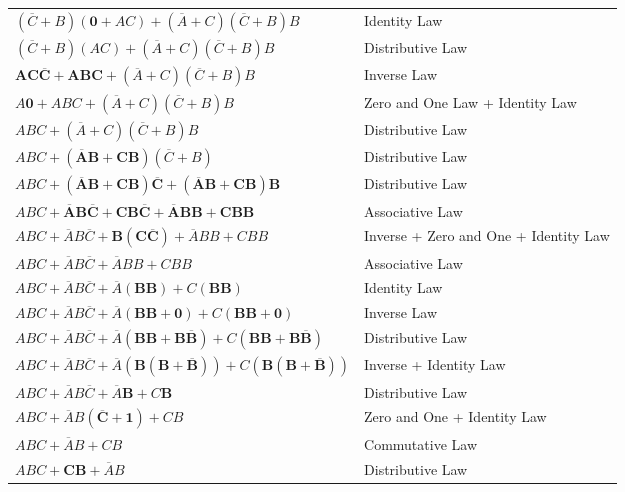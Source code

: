\documentclass{article}
\begin{document}
\begin{enumerate}
\begin{enumerate}
\begin{tabular}{l l}
                $(\overline{C} + B)(\mathbf{0} + AC) + (\overline{A} + C)(\overline{C} + B)B$ & Identity Law \\
                $(\overline{C} + B)(AC) + (\overline{A} + C)(\overline{C} + B)B$ & Distributive Law \\
                $\mathbf{AC\overline{C} + ABC} + (\overline{A} + C)(\overline{C} + B)B$ & Inverse Law\\
                $A\mathbf{0} + ABC + (\overline{A} + C)(\overline{C} + B)B$ & Zero and One Law + Identity Law\\
                $ABC + (\overline{A} + C)(\overline{C} + B)B$ & Distributive Law\\
                $ABC + \mathbf{(\overline{A}B+CB)}(\overline{C} + B)$ & Distributive Law\\
                $ABC + \mathbf{(\overline{A}B + CB)\overline{C} + (\overline{A}B + CB)B}$ & Distributive Law\\
                $ABC + \mathbf{\overline{A}B\overline{C} + CB\overline{C} + \overline{A}BB + CBB}$ & Associative Law\\
                $ABC + \overline{A}B\overline{C} + \mathbf{B(C\overline{C})} + \overline{A}BB + CBB$ & Inverse + Zero and One + Identity Law\\
                $ABC + \overline{A}B\overline{C} + \overline{A}BB + CBB$ & Associative Law\\
                $ABC + \overline{A}B\overline{C} + \overline{A}\mathbf{(BB)} + C\mathbf{(BB)}$ & Identity Law\\
                $ABC + \overline{A}B\overline{C} + \overline{A}\mathbf{(BB + 0)} + C\mathbf{(BB + 0)}$ & Inverse Law\\
                $ABC + \overline{A}B\overline{C} + \overline{A}\mathbf{(BB + B\overline{B})} + C\mathbf{(BB + B\overline{B})}$ & Distributive Law\\
                $ABC + \overline{A}B\overline{C} + \overline{A}\mathbf{(B(B+\overline{B}))} + C\mathbf{(B(B+\overline{B}))}$ & Inverse + Identity Law\\
                $ABC + \overline{A}B\overline{C} + \overline{A}\mathbf{B} + C\mathbf{B}$ & Distributive Law\\
                $ABC + \overline{A}B(\mathbf{\overline{C} + 1}) + CB$ & Zero and One + Identity Law\\
                $ABC + \overline{A}B + CB$ & Commutative Law\\
                $ABC + \mathbf{CB} + \overline{A}B$ & Distributive Law\\

\end{tabular}
\end{enumerate}
\end{enumerate}
\end{document}
